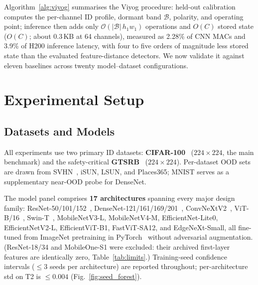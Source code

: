 \documentclass[10pt,letterpaper,journal]{IEEEtran}
\begin{document}
Algorithm~\ref{alg:viyog} summarises the Viyog procedure: held-out calibration
computes the per-channel ID profile, dormant band $\mathcal{B}$, polarity, and
operating point; inference then adds only
$\mathcal{O}(|\mathcal{B}|\,h_1 w_1)$ operations and $O(C)$ stored state
($O(C)$; about 0.3\,KB at 64 channels), measured as 2.28\% of CNN MACs and 3.9\% of H200
inference latency, with four to five orders of magnitude less stored state than
the evaluated feature-distance detectors. We now validate it against eleven baselines across twenty
model--dataset configurations.

\section{Experimental Setup}
\label{sec:setup}

\subsection{Datasets and Models}
All experiments use two primary ID datasets: \textbf{CIFAR-100}~\cite{krizhevsky2009learning}
($224{\times}224$, the main benchmark) and the safety-critical
\textbf{GTSRB}~\cite{stallkamp2012man} ($224{\times}224$).
Per-dataset OOD sets are drawn from SVHN~\cite{netzer2011reading}, iSUN, LSUN,
and Places365; MNIST serves as a supplementary near-OOD probe for DenseNet.

The model panel comprises \textbf{17 architectures} spanning every major
design family: ResNet-50/101/152~\cite{he2016deep},
DenseNet-121/161/169/201~\cite{huang2017densely},
ConvNeXtV2~\cite{woo2023convnext}, ViT-B/16~\cite{dosovitskiy2020image},
Swin-T~\cite{liu2021swin}, MobileNetV3-L, MobileNetV4-M,
EfficientNet-Lite0, EfficientNetV2-L,
EfficientViT-B1, FastViT-SA12, and EdgeNeXt-Small, all
fine-tuned from ImageNet pretraining in
PyTorch~\cite{paszke2019pytorch} without adversarial augmentation. (ResNet-18/34
and MobileOne-S1 were excluded: their archived first-layer features are
identically zero, Table~\ref{tab:limits}.)
Training-seed confidence intervals (${\le}3$ seeds per architecture) are
reported throughout; per-architecture std on T2 is ${\le}0.004$ (Fig.~\ref{fig:seed_forest}).
\end{document}
